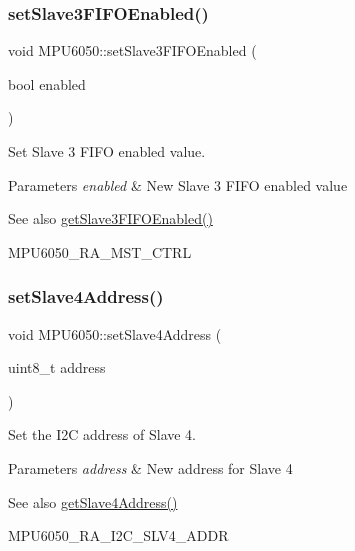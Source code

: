 \subsubsection{\texorpdfstring{setSlave3FIFOEnabled()}{setSlave3FIFOEnabled()}}
{\footnotesize\ttfamily void M\+P\+U6050\+::set\+Slave3\+F\+I\+F\+O\+Enabled (\begin{DoxyParamCaption}\item[{bool}]{enabled }\end{DoxyParamCaption})}

Set Slave 3 F\+I\+FO enabled value. 
\begin{DoxyParams}{Parameters}
{\em enabled} & New Slave 3 F\+I\+FO enabled value \\
\hline
\end{DoxyParams}
\begin{DoxySeeAlso}{See also}
\mbox{\hyperlink{class_m_p_u6050_a9d75ec63e2320ecfb84a2b082397f900}{get\+Slave3\+F\+I\+F\+O\+Enabled()}} 

M\+P\+U6050\+\_\+\+R\+A\+\_\+\+M\+S\+T\+\_\+\+C\+T\+RL 
\end{DoxySeeAlso}
\mbox{\label{class_m_p_u6050_a6985da2cbc37be3fefbe3c16bf8d34a6}} 
\subsubsection{\texorpdfstring{setSlave4Address()}{setSlave4Address()}}
{\footnotesize\ttfamily void M\+P\+U6050\+::set\+Slave4\+Address (\begin{DoxyParamCaption}\item[{uint8\+\_\+t}]{address }\end{DoxyParamCaption})}

Set the I2C address of Slave 4. 
\begin{DoxyParams}{Parameters}
{\em address} & New address for Slave 4 \\
\hline
\end{DoxyParams}
\begin{DoxySeeAlso}{See also}
\mbox{\hyperlink{class_m_p_u6050_a4278dec5fec25be9a6f45b51a3373ad2}{get\+Slave4\+Address()}} 

M\+P\+U6050\+\_\+\+R\+A\+\_\+\+I2\+C\+\_\+\+S\+L\+V4\+\_\+\+A\+D\+DR 
\end{DoxySeeAlso}
\mbox{\label{class_m_p_u6050_a04be2a8c3af6ef174f97769b9b5164a9}} 
